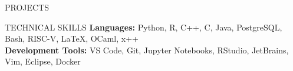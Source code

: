 \documentclass{resume} %
\begin{document}
\begin{rSection}{PROJECTS}
 \vspace{-4pt}
 
 
\end{rSection} 
\vspace{-6pt}
\begin{rSection}{TECHNICAL SKILLS}
\textbf{Languages:} Python, R, C++, C, Java, PostgreSQL, Bash, RISC-V, LaTeX, OCaml, x++\\
\textbf{Development Tools:} VS Code, Git, Jupyter Notebooks, RStudio, JetBrains, Vim, Eclipse, Docker
\end{rSection}
\vspace{-6pt}
\end{document}
